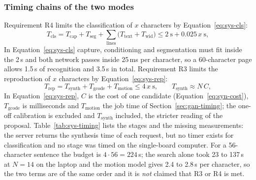 \subsubsection{Timing chains of the two modes}

Requirement R4 limits the classification of $x$ characters by Equation~\ref{eq:sys-cls}:
\begin{equation}
T_{\mathrm{cls}}=T_{\mathrm{cap}}+T_{\mathrm{seg}}+\sum_{\mathrm{lines}}\bigl(T_{\mathrm{text}}+T_{\mathrm{wid}}\bigr)\le2\ \mathrm{s}+0.025\,x\ \mathrm{s},
\label{eq:sys-cls}
\end{equation}
In Equation~\ref{eq:sys-cls} capture, conditioning and segmentation must fit inside the 2\,s and both network passes inside 25\,ms per character, so a 60-character page allows 1.5\,s of recognition and 3.5\,s in total.
Requirement R3 limits the reproduction of $x$ characters by Equation~\ref{eq:sys-rep}:
\begin{equation}
T_{\mathrm{rep}}=T_{\mathrm{synth}}+T_{\mathrm{gcode}}+T_{\mathrm{motion}}\le4\,x\ \mathrm{s},\qquad T_{\mathrm{synth}}\approx N\,C,
\label{eq:sys-rep}
\end{equation}
In Equation~\ref{eq:sys-rep}, $C$ is the cost of one candidate (Equation~\ref{eq:syn-cost}), $T_{\mathrm{gcode}}$ is milliseconds and $T_{\mathrm{motion}}$ the job time of Section~\ref{sec:gan-timing}; the one-off calibration is excluded and $T_{\mathrm{synth}}$ included, the stricter reading of the proposal.
Table~\ref{tab:sys-timing} lists the stages and the missing measurements: the server returns the synthesis time of each request, but no timer exists for classification and no stage was timed on the single-board computer.
For a 56-character sentence the budget is $4\cdot56=224$\,s; the search alone took 23 to 137\,s at $N=14$ on the laptop and the motion model gives 2.4 to 2.8\,s per character, so the two terms are of the same order and it is \emph{not} claimed that R3 or R4 is met.

